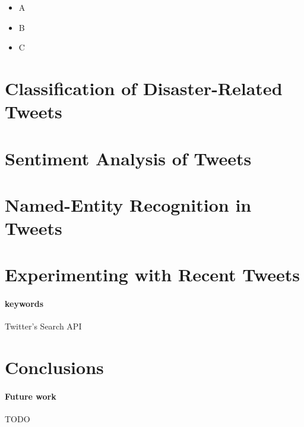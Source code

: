 \documentclass[letterpaper,twocolumn,10pt]{article}
\begin{document}
\begin{itemize}[noitemsep,nolistsep]
	\item A
	\item B
	\item C
\end{itemize}



\section{Classification of Disaster-Related Tweets}


\todo{}


\section{Sentiment Analysis of Tweets}

\todo{}

\section{Named-Entity Recognition in Tweets}

\todo{}

\section{Experimenting with Recent Tweets}

\paragraph{keywords}Twitter's Search API


\section{Conclusions}

\paragraph{Future work} TODO


{\footnotesize 
}

\theendnotes
\end{document}
